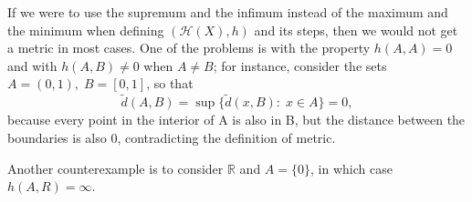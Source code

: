 \documentclass[../fractals_everywhere.tex]{subfiles}
\begin{document}
\begin{tcolorbox}[
		skin=enhanced,
		title=Observation,
		fonttitle=\bfseries,
		colframe=black,
		colbacktitle=cyan!75!white,
		colback=cyan!15,
		colbacklower=black,
		coltitle=black,
		drop fuzzy shadow,
	]
	If we were to use the supremum and the infimum instead of the maximum and the minimum when defining \((\mathcal{H}(X), h)\) and its steps, then we would not get a metric in most cases.
	One of the problems is with the property \(h(A ,A) = 0\) and with \(h(A, B)\neq 0\) when \(A\neq B\); for instance, consider the sets \(A = (0, 1),\; B = [0,1]\), so that
	\[
		\tilde{d}(A, B) = \sup_{}\{\tilde{d}(x, B):\; x\in A\} = 0,
	\]
	because every point in the interior of A is also in B, but the distance between the boundaries is also 0, contradicting the definition of metric.

	Another counterexample is to consider \(\mathbb{R}\) and \(A = \{0\}\), in which case \linebreak \(h(A, R) = \infty\).
\end{tcolorbox}
\end{document}
